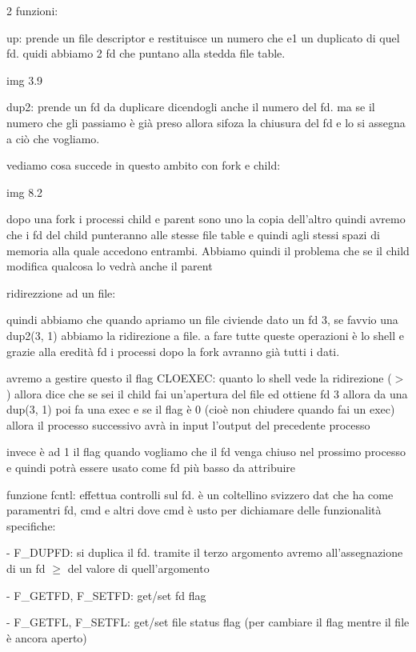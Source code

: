 2 funzioni:

up: prende un file descriptor e restituisce un numero che e1 un duplicato di quel fd. quidi abbiamo 2 fd che puntano alla stedda file table.


img 3.9


dup2: prende un fd da duplicare dicendogli anche il numero del fd. ma se il numero che gli passiamo è già preso allora sifoza la chiusura del fd e lo si assegna a ciò che vogliamo.



vediamo cosa succede in questo ambito con fork e child:


img 8.2 


dopo una fork i processi child e parent sono uno la copia dell'altro quindi avremo che i fd del child punteranno alle stesse file table e quindi agli stessi spazi di memoria alla quale accedono entrambi. Abbiamo quindi il problema che se il child modifica qualcosa lo vedrà anche il parent





ridirezzione ad un file:

quindi abbiamo che quando apriamo un file civiende dato un fd 3, se favvio una dup2(3, 1) abbiamo la ridirezione a file. a fare tutte queste operazioni è lo shell e grazie alla eredità fd i processi dopo la fork avranno già tutti i dati.

avremo a gestire questo il flag CLOEXEC: quanto lo shell vede la ridirezione ($>$) allora dice che se sei il child fai un'apertura del file ed ottiene fd 3 allora da una dup(3, 1) poi fa una exec e se il flag è 0 (cioè non chiudere quando fai un exec) allora il processo successivo avrà in input l'output del precedente  processo

invece è ad 1 il flag quando vogliamo che il fd venga chiuso nel prossimo processo e quindi potrà essere usato come fd più basso da attribuire


funzione fcntl:
 effettua controlli sul fd. è un coltellino svizzero dat che ha come paramentri fd, cmd e altri dove cmd è usto per dichiamare delle funzionalità specifiche:

- F\_DUPFD: si duplica il fd. tramite il terzo argomento avremo all'assegnazione di un fd $\geq$ del valore di quell'argomento

- F\_GETFD, F\_SETFD: get/set fd flag

- F\_GETFL, F\_SETFL: get/set file status flag (per cambiare il flag mentre il file è ancora aperto)

